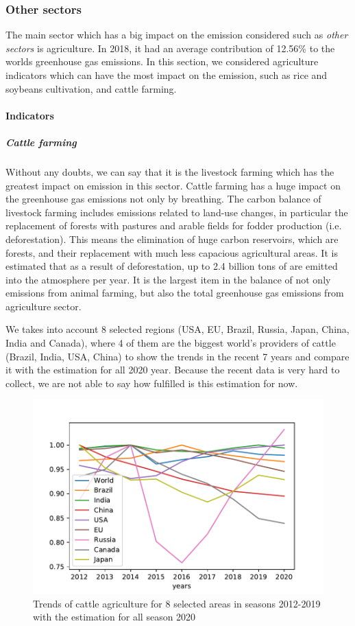 \subsubsection{Other sectors}

The main sector which has a big impact on the \co emission considered such as \emph{other sectors} is agriculture. In 2018, it had an average contribution of 12.56\% to the worlds greenhouse gas emissions. In this section, we considered agriculture indicators which can have the most impact on the \co emission, such as rice and soybeans cultivation, and cattle farming. 

\paragraph{Indicators}

\subparagraph{Cattle farming}

Without any doubts, we can say that it is the livestock farming which has the greatest impact on \co emission in this sector. Cattle farming has a huge impact on the greenhouse gas emissions not only by breathing. The carbon balance of livestock farming includes emissions related to land-use changes, in particular the replacement of forests with pastures and arable fields for fodder production (i.e. deforestation). This means the elimination of huge carbon reservoirs, which are forests, and their replacement with much less capacious agricultural areas. It is estimated that as a result of deforestation, up to 2.4 billion tons of \co are emitted into the atmosphere per year. It is the largest item in the balance of not only \co emissions from animal farming, but also the total greenhouse gas emissions from agriculture sector.

We takes into account 8 selected regions (USA, EU, Brazil, Russia, Japan, China, India and Canada), where 4 of them are the biggest world's providers of cattle (Brazil, India, USA, China) to show the trends in the recent 7 years and compare it with the estimation for all 2020 year. Because the recent data is very hard to collect, we are not able to say how fulfilled is this estimation for now. 

\begin{figure}[hb]
	\centering
	\includegraphics[width=0.7\linewidth]{../agriculture/Graph_cattle.pdf}
	\caption{Trends of cattle agriculture for 8 selected areas in seasons 2012-2019 with the estimation for all season 2020}
	\label{fig:Graph_cattle}
\end{figure}


